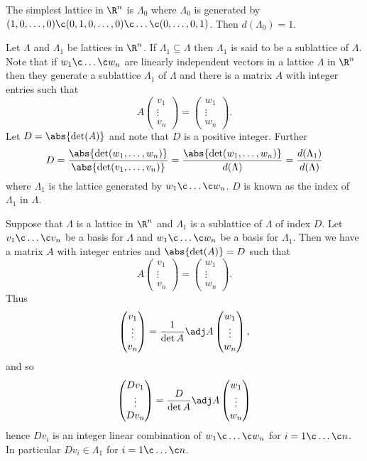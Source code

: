 The simplest lattice in $\R^n$ is $\Lambda_0$ where $\Lambda_0$ is generated by $(1,0,\dotsc,0)\c (0,1,0,\dotsc,0)\c \dotsc\c (0,\dotsc,0,1)$.  Then $d(\Lambda_0)=1$.

Let $\Lambda$ and $\Lambda_1$ be lattices in $\R^n$.  If $\Lambda_1\subseteq\Lambda$ then $\Lambda_1$ is said to be a sublattice of $\Lambda$.  Note that if $w_1\c \dotsc\c w_n$ are linearly independent vectors in a lattice $\Lambda$ in $\R^n$ then they generate a sublattice $\Lambda_1$ of $\Lambda$ and there is a matrix $A$ with integer entries such that
\[ A \begin{pmatrix}v_1\\\vdots\\v_n\end{pmatrix} = \begin{pmatrix}w_1\\\vdots\\w_n\end{pmatrix} . \]
Let $D=\abs{\det(A)}$ and note that $D$ is a positive integer.  Further
\[ D = \frac{\abs{\det(w_1,\dotsc,w_n)}}{\abs{\det(v_1,\dotsc,v_n)}} = \frac{\abs{\det(w_1,\dotsc,w_n)}}{d(\Lambda)} = \frac{d(\Lambda_1)}{d(\Lambda)} \]
where $\Lambda_1$ is the lattice generated by $w_1\c \dotsc\c w_n$.  $D$ is known as the index of $\Lambda_1$ in $\Lambda$.

Suppose that $\Lambda$ is a lattice in $\R^n$ and $\Lambda_1$ is a sublattice of $\Lambda$ of index $D$.  Let $v_1\c \dotsc\c v_n$ be a basis for $\Lambda$ and $w_1\c \dotsc\c w_n$ be a basis for $\Lambda_1$.  Then we have a matrix $A$ with integer entries and $\abs{\det(A)}=D$ such that
\[ A \begin{pmatrix}v_1\\\vdots\\v_n\end{pmatrix} = \begin{pmatrix}w_1\\\vdots\\w_n\end{pmatrix} . \]
Thus
\[ \begin{pmatrix}v_1\\\vdots\\v_n\end{pmatrix} = \frac{1}{\det A} \adj A \begin{pmatrix}w_1\\\vdots\\w_n\end{pmatrix} , \]
and so
\[ \begin{pmatrix}D v_1\\\vdots\\D v_n\end{pmatrix} = \frac{D}{\det A} \adj A \begin{pmatrix}w_1\\\vdots\\w_n\end{pmatrix} \]
hence $Dv_i$ is an integer linear combination of $w_1\c \dotsc\c w_n$ for $i=1\c \dotsc\c n$.  In particular $Dv_i\in\Lambda_1$ for $i=1\c \dotsc\c n$.

